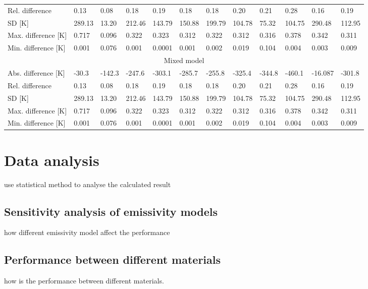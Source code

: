 \begin{table}
\begin{tabular}{llllllllllll}
        Rel. difference         & 0.13                           & 0.08                          & 0.18    & 0.19    & 0.18    & 0.18    & 0.20    & 0.21    & 0.28    & 0.16    & 0.19    \\
        SD {[}K{]}              & 289.13                         & 13.20                         & 212.46  & 143.79  & 150.88  & 199.79  & 104.78  & 75.32   & 104.75  & 290.48  & 112.95  \\
        Max. difference {[}K{]} & 0.717                          & 0.096                         & 0.322   & 0.323   & 0.312   & 0.322   & 0.312   & 0.316   & 0.378   & 0.342   & 0.311   \\
        Min. difference {[}K{]} & 0.001                          & 0.076                         & 0.001   & 0.0001  & 0.001   & 0.002   & 0.019   & 0.104   & 0.004   & 0.003   & 0.009   \\ \hline
        \multicolumn{12}{c}{Mixed model}                                                                                                                                                   \\ \hline
        Abs. difference {[}K{]} & -30.3                          & -142.3                        & -247.6  & -303.1  & -285.7  & -255.8  & -325.4  & -344.8  & -460.1  & -16.087 & -301.8  \\
        Rel. difference         & 0.13                           & 0.08                          & 0.18    & 0.19    & 0.18    & 0.18    & 0.20    & 0.21    & 0.28    & 0.16    & 0.19    \\
        SD {[}K{]}              & 289.13                         & 13.20                         & 212.46  & 143.79  & 150.88  & 199.79  & 104.78  & 75.32   & 104.75  & 290.48  & 112.95  \\
        Max. difference {[}K{]} & 0.717                          & 0.096                         & 0.322   & 0.323   & 0.312   & 0.322   & 0.312   & 0.316   & 0.378   & 0.342   & 0.311   \\
        Min. difference {[}K{]} & 0.001                          & 0.076                         & 0.001   & 0.0001  & 0.001   & 0.002   & 0.019   & 0.104   & 0.004   & 0.003   & 0.009  
    \end{tabular}
\end{table}


\section{Data analysis}
use statistical method to analyse the calculated result
\subsection{Sensitivity analysis of emissivity models}
how different emissivity model affect the performance 
\subsection{Performance between different materials}
how is the performance between different materials.